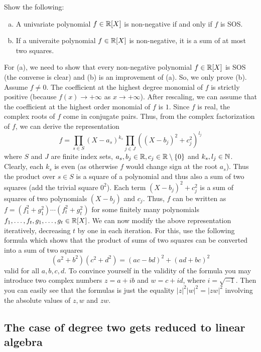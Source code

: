 \begin{exercise}
	\label{univariate}
	Show the following: 
	\begin{enumerate}[(a)]
		\item A univariate polynomial $f \in \mathbb{R}[X]$ is non-negative if and only if $f$ is SOS. 
		\item If a univeraite polynomial $f \in \mathbb{R}[X]$ is non-negative, it is a sum of at most two squares. 
	\end{enumerate}
\end{exercise}
\begin{solution}
	For (a), we need to show that every non-negative polynomial $f \in \mathbb{R}[X]$ is SOS (the converse is clear) and (b) is an improvement of (a). So, we only prove (b). Assume $f \ne 0$. The coefficient at the highest degree monomial of $f$ is strictly positive (because $f(x) \to +\infty$ as $x\to +\infty$). After rescaling, we can assume that the coefficient at the highest order monomial of $f$ is $1$. Since $f$ is real, the complex roots of $f$ come in conjugate pairs. Thus, from the complex factorization of $f$, we can derive the representation 
	\[
		f = \prod_{s \in S} (X-a_s)^{k_s} \prod_{j \in J} ( (X-b_j)^2  + c_j^2)^{l_j}
	\]
	where $S$ and $J$ are finite index sets, $a_s, b_j \in \mathbb{R}, c_j \in \mathbb{R} \setminus \{0\}$ and $k_s,l_j \in \mathbb{N}$. Clearly, each $k_s$ is even (as otherwise $f$ would change sign at the root $a_s$). Thus the product over $s \in S$ is a square of a polynomial and thus also a sum of two squares (add the trivial square $0^2$). Each term $(X-b_j)^2 + c_j^2$ is a sum of squares of two polynomials $(X-b_j)$ and $c_j$. Thus, $f$ can be written as $f = (f_1^2 + g_1^2 ) \cdots (f_t^2 + g_t^2)$ for some finitely many polynomials $f_1,\ldots,f_t,g_1,\ldots,g_t \in \mathbb{R}[X]$. We can now modify the above representation iteratively, decreasing $t$ by one in each iteration. For this, use the following formula which shows that the product of sums of two squares can be converted into a sum of two squares
	\[
		(a^2 + b^2) (c^2 + d^2) = (ac - bd)^2 + (ad + bc)^2
	\]
	valid for all $a,b,c,d$. To convince yourself in the validity of the formula you may introduce two complex numbers $z = a + i b$ and $w = c + i d$, where $i=\sqrt{-1}$. Then you can easily see that the formulas is just the equality $|z|^2 |w|^2 = |zw|^2$ involving the absolute values of $z, w$ and $zw$. 
\end{solution}

\subsection{The case of degree two gets reduced to linear algebra} 

